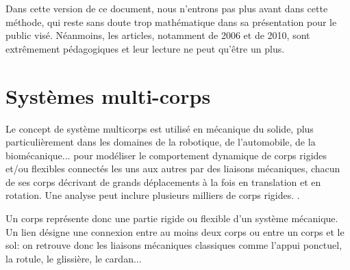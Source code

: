 \medskip
Dans cette version de ce document, nous n'entrons pas plus avant dans cette méthode, qui reste sans doute trop mathématique dans sa présentation pour le public visé. Néanmoins, les articles, notamment de 2006 et de 2010, sont extrêmement pédagogiques et leur lecture ne peut qu'être un plus.





\medskip
\section{Systèmes multi-corps}\label{Sec-MBS}

Le concept de système multicorps est utilisé en mécanique du solide, plus particulièrement dans les domaines de la robotique, de l'automobile, de la biomécanique... pour modéliser le comportement dynamique de corps rigides et/ou flexibles connectés les uns aux autres par des liaisons mécaniques, chacun de ses corps décrivant de grands déplacements à la fois en translation et en rotation. Une analyse peut inclure plusieurs milliers de corps rigides.  .

Un corps représente donc une partie rigide ou flexible d'un système mécanique. Un lien désigne une connexion entre au moins deux corps ou entre un corps et le sol: on retrouve donc les liaisons mécaniques classiques comme l'appui ponctuel, la rotule, le glissière, le cardan...

